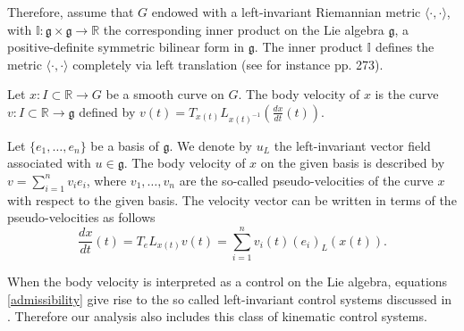 \documentclass[letterpaper, 10 pt, conference]{ieeeconf}  %
\newcommand{\R}{\mathbb{R}}
\begin{document}
Therefore, assume that $G$ endowed with a left-invariant  Riemannian metric $\langle\cdot,\cdot\rangle$, with $\mathbb{I}:\mathfrak{g}\times \mathfrak{g}\to\R$ the corresponding inner product on the Lie algebra $\mathfrak{g}$, a positive-definite symmetric bilinear form in $\mathfrak{g}$.  The inner product $\mathbb{I}$ defines  the metric $\langle\cdot,\cdot\rangle$ completely via left translation (see for instance \cite{bookBullo} pp. 273).




Let $x:I\subset\mathbb{R}\to G$ be a smooth curve on $G$. The body velocity of $x$ is the curve $v:I\subset\mathbb{R}\to\mathfrak{g}$ defined by $\displaystyle{v(t)=T_{x(t)}L_{x(t)^{-1}}\left(\frac{dx}{dt}(t)\right)}$.

Let $\{e_1,\ldots,e_n\}$ be a basis of $\mathfrak{g}$. We denote by $u_{L}$ the left-invariant vector field associated with $u\in\mathfrak{g}$. The body velocity of $x$ on the given basis is described  by $\displaystyle{v=\sum_{i=1}^n v_i e_i}$, where $v_1,\ldots, v_n$ are  the so-called pseudo-velocities
of the curve $x$ with respect to the given basis. The velocity vector can be written in terms of the pseudo-velocities as follows
\begin{equation}\label{admissibility}\frac{dx}{dt}(t)=T_eL_{x(t)}v(t)=\sum_{i=1}^n v_i(t) (e_i)_L(x(t)).\end{equation}

When the body velocity is interpreted as a control on the Lie algebra, equations \eqref{admissibility} give rise to the so called left-invariant control systems discussed in \cite{CoDi}. Therefore our analysis also includes this class of kinematic control systems.
\end{document}
